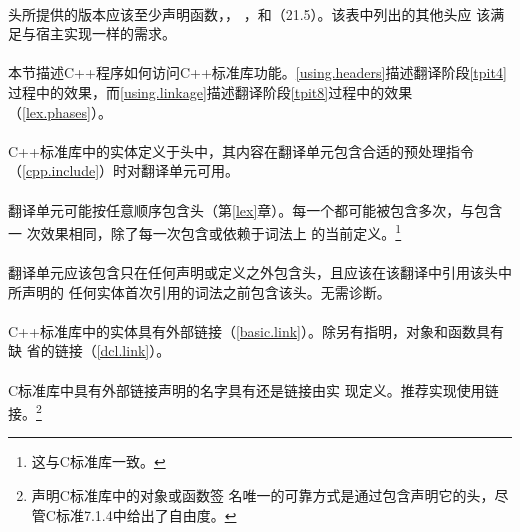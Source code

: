 \paragraph{}
头所提供的版本应该至少声明函数，，
，和（21.5）。该表中列出的其他头应
该满足与宿主实现一样的需求。

\paragraph{}
本节描述C++程序如何访问C++标准库功能。\ref{using.headers}描述翻译阶段\ref{tpit4}
过程中的效果，而\ref{using.linkage}描述翻译阶段\ref{tpit8}过程中的效果
（\ref{lex.phases}）。

\paragraph{}
C++标准库中的实体定义于头中，其内容在翻译单元包含合适的预处理指令
（\ref{cpp.include}）时对翻译单元可用。

\paragraph{}
翻译单元可能按任意顺序包含头（第\ref{lex}章）。每一个都可能被包含多次，与包含一
次效果相同，除了每一次包含或依赖于词法上
的当前定义。\footnote{这与C标准库一致。}

\paragraph{}
翻译单元应该包含只在任何声明或定义之外包含头，且应该在该翻译中引用该头中所声明的
任何实体首次引用的词法之前包含该头。无需诊断。

\paragraph{}
C++标准库中的实体具有外部链接（\ref{basic.link}）。除另有指明，对象和函数具有缺
省的链接（\ref{dcl.link}）。

\paragraph{}
C标准库中具有外部链接声明的名字具有还是链接由实
现定义。推荐实现使用链接。\footnote{声明C标准库中的对象或函数签
名唯一的可靠方式是通过包含声明它的头，尽管C标准7.1.4中给出了自由度。}

